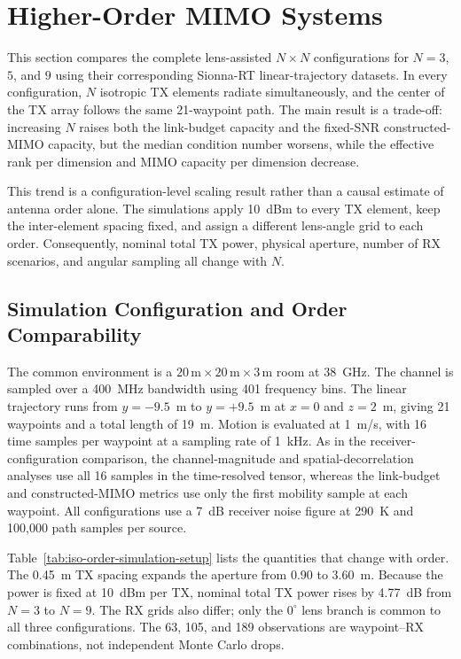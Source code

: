 \section{Higher-Order MIMO Systems}\label{sec:higher-order-mimo}

This section compares the complete lens-assisted $N\times N$ configurations for $N=3$, $5$, and $9$ using their corresponding Sionna-RT linear-trajectory datasets. In every configuration, $N$ isotropic TX elements radiate simultaneously, and the center of the TX array follows the same 21-waypoint path. The main result is a trade-off: increasing $N$ raises both the link-budget capacity and the fixed-SNR constructed-MIMO capacity, but the median condition number worsens, while the effective rank per dimension and MIMO capacity per dimension decrease.

This trend is a configuration-level scaling result rather than a causal estimate of antenna order alone. The simulations apply 10~dBm to every TX element, keep the inter-element spacing fixed, and assign a different lens-angle grid to each order. Consequently, nominal total TX power, physical aperture, number of RX scenarios, and angular sampling all change with $N$.

\subsection{Simulation Configuration and Order Comparability}

The common environment is a $20\,\text{m}\times20\,\text{m}\times3\,\text{m}$ room at 38~GHz. The channel is sampled over a 400~MHz bandwidth using 401 frequency bins. The linear trajectory runs from $y=-9.5$~m to $y=+9.5$~m at $x=0$ and $z=2$~m, giving 21 waypoints and a total length of 19~m. Motion is evaluated at 1~m/s, with 16 time samples per waypoint at a sampling rate of 1~kHz. As in the receiver-configuration comparison, the channel-magnitude and spatial-decorrelation analyses use all 16 samples in the time-resolved tensor, whereas the link-budget and constructed-MIMO metrics use only the first mobility sample at each waypoint. All configurations use a 7~dB receiver noise figure at 290~K and 100{,}000 path samples per source.

Table~\ref{tab:iso-order-simulation-setup} lists the quantities that change with order. The 0.45~m TX spacing expands the aperture from 0.90 to 3.60~m. Because the power is fixed at 10~dBm per TX, nominal total TX power rises by 4.77~dB from $N=3$ to $N=9$. The RX grids also differ; only the $0^\circ$ lens branch is common to all three configurations. The 63, 105, and 189 observations are waypoint--RX combinations, not independent Monte Carlo drops.

